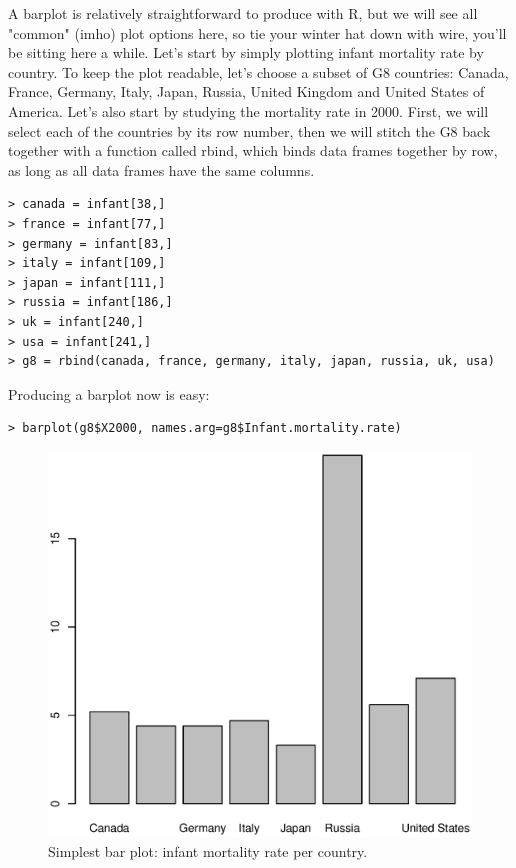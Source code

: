 \documentclass{report}
\newcommand{\code}[1]{\textsf{\ttfamily #1}}
\begin{document}
A barplot is relatively straightforward to produce with R, but we will see all "common" (imho) plot options here, so tie your winter hat down with wire, you'll be sitting here a while.  Let's start by simply plotting infant mortality rate by country. To keep the plot readable, let's choose a subset of G8 countries: Canada, France, Germany, Italy, Japan, Russia, United Kingdom and United States of America. Let's also start by studying the mortality rate in 2000. First, we will select each of the countries by its row number, then we will stitch the G8 back together with a function called \code{rbind}, which binds data frames together by row, as long as all data frames have the same columns.
\begin{verbatim}
> canada = infant[38,]
> france = infant[77,]
> germany = infant[83,]
> italy = infant[109,]
> japan = infant[111,]
> russia = infant[186,]
> uk = infant[240,]
> usa = infant[241,]
> g8 = rbind(canada, france, germany, italy, japan, russia, uk, usa)
 \end{verbatim}

Producing a barplot now is easy:
\begin{verbatim}
> barplot(g8$X2000, names.arg=g8$Infant.mortality.rate)
 \end{verbatim}
\begin{figure}[h]
	\centering
	\includegraphics[width=1.0\textwidth]{barsimple.eps}
	\caption{Simplest bar plot: infant mortality rate per country.}
\label{fig:simplebar}
\end{figure}
\end{document}
